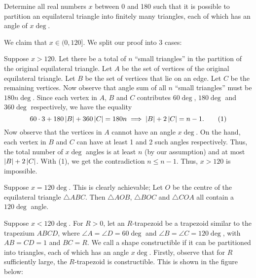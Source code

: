 \begin{question}[$x \in {(0, 120]}$]\label{A::2023-O-2-5}
    Determine all real numbers $x$ between 0 and 180 such that it is possible to partition an equilateral triangle into finitely many triangles, each of which has an angle of $x\deg$.
\end{question}

\begin{solution*}
    We claim that $x \in (0, 120]$. We split our proof into 3 cases:

     Suppose $x > 120$. Let there be a total of $n$ ``small triangles'' in the partition of the original equilateral triangle. Let $A$ be the set of vertices of the original equilateral triangle. Let $B$ be the set of vertices that lie on an edge. Let $C$ be the remaining vertices. Now observe that angle sum of all $n$ ``small triangles'' must be $180n\deg$. Since each vertex in $A$, $B$ and $C$ contributes $60\deg$, $180\deg$ and $360\deg$ respectively, we have the equality \[60\cdot3 + 180\left\lvert B \right\rvert + 360\left\lvert C \right\rvert = 180n \implies  \left\lvert B \right\rvert + 2\left\lvert C \right\rvert = n-1. \tag{1}\] Now observe that the vertices in $A$ cannot have an angle $x\deg$. On the hand, each vertex in $B$ and $C$ can have at least 1 and 2 such angles respectively. Thus, the total number of $x\deg$ angles is at least $n$ (by our assumption) and at most $\left\lvert B \right\rvert + 2\left\lvert C \right\rvert$. With (1), we get the contradiction $n \leq n-1$. Thus, $x > 120$ is impossible.

     Suppose $x = 120\deg$. This is clearly achievable; Let $O$ be the centre of the equilateral triangle $\triangle ABC$. Then $\triangle AOB$, $\triangle BOC$ and $\triangle COA$ all contain a $120\deg$ angle.

     Suppose $x < 120\deg$. For $R > 0$, let an $R$-trapezoid be a trapezoid similar to the trapezium $ABCD$, where $\angle A = \angle D = 60\deg$ and $\angle B = \angle C = 120\deg$, with $AB = CD = 1$ and $BC = R$. We call a shape constructible if it can be partitioned into triangles, each of which has an angle $x \deg$. Firstly, observe that for $R$ sufficiently large, the $R$-trapezoid is constructible. This is shown in the figure below:
    \begin{center}
\end{center}
\end{solution*}

